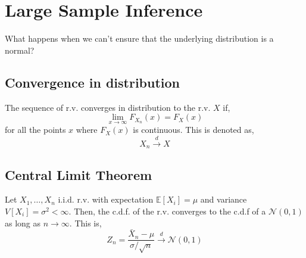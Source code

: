 \section{Large Sample Inference}
What happens when we can't ensure that the underlying distribution is a normal?

\subsection{Convergence in distribution}
The sequence of r.v. converges in distribution to the r.v. $X$ if,
\[ \lim_{x\rightarrow\infty}F_{X_n}(x) = F_X(x) \]
for all the points $x$ where $F_X(x)$ is continuous. This is denoted as,
\[ X_n \xrightarrow{d} X \]  

\subsection{Central Limit Theorem}
Let $X_1,\dots,X_n$ i.i.d. r.v. with expectation $\mathbb{E}[X_i] = \mu$ and variance $V[X_i]=\sigma^2 < \infty$. Then, the c.d.f. of the r.v. converges to the c.d.f 
of a $\mathcal{N}(0,1)$ as long as $n \rightarrow \infty$. This is,
\[ Z_n = \frac{\bar{X}_n - \mu}{\sigma/\sqrt{n}} \xrightarrow{d} \mathcal{N}(0,1)\]












